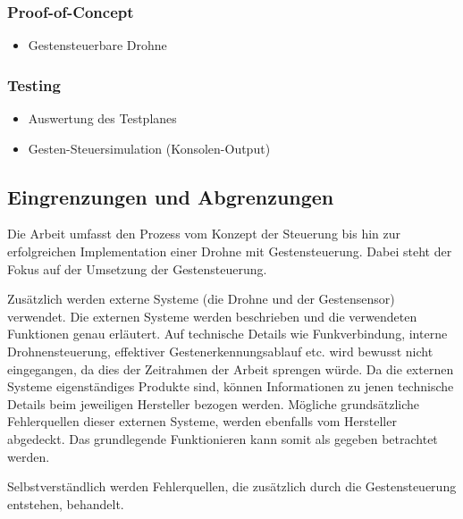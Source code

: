 \subsubsection{Proof-of-Concept}
\begin{itemize}
	\item Gestensteuerbare Drohne
\end{itemize}

\subsubsection{Testing}
\begin{itemize}
	\item Auswertung des Testplanes
	\item Gesten-Steuersimulation (Konsolen-Output)
\end{itemize}


\subsection{Eingrenzungen und Abgrenzungen}
Die Arbeit umfasst den Prozess vom Konzept der Steuerung bis hin zur erfolgreichen Implementation einer Drohne mit Gestensteuerung.
Dabei steht der Fokus auf der Umsetzung der Gestensteuerung.

Zusätzlich werden externe Systeme (die Drohne und der Gestensensor) verwendet.
Die externen Systeme werden beschrieben und die verwendeten Funktionen genau erläutert.
Auf technische Details wie Funkverbindung, interne Drohnensteuerung, effektiver Gestenerkennungsablauf etc. wird bewusst nicht eingegangen, da dies der Zeitrahmen der Arbeit sprengen würde.
Da die externen Systeme eigenständiges Produkte sind, können Informationen zu jenen technische Details beim jeweiligen Hersteller bezogen werden.
Mögliche grundsätzliche Fehlerquellen dieser externen Systeme, werden ebenfalls vom Hersteller abgedeckt.
Das grundlegende Funktionieren kann somit als gegeben betrachtet werden.

Selbstverständlich werden Fehlerquellen, die zusätzlich durch die Gestensteuerung entstehen, behandelt.
